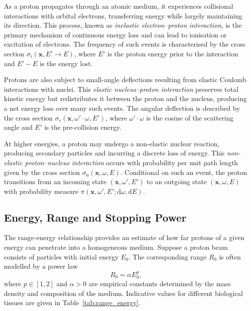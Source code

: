 \documentclass{amsart}
\newcommand{\dd}{{\mathrm d}}
\theoremstyle{plain}
\renewcommand{\vec}[1]{\ensuremath{\boldsymbol{#1}}}
\begin{document}
As a proton propagates through an atomic medium, it experiences
collisional interactions with orbital electrons, transferring energy
while largely maintaining its direction. This process, known as
\emph{inelastic electron--proton interaction}, is the primary
mechanism of continuous energy loss and can lead to ionisation or
excitation of electrons. The frequency of such events is characterised
by the cross section $\sigma_i(\vec{x}, E' \to E)$, where $E'$ is the
proton energy prior to the interaction and $E' - E$ is the energy
lost.

Protons are also subject to small-angle deflections resulting from
elastic Coulomb interactions with nuclei. This \emph{elastic
nucleus--proton interaction} preserves total kinetic energy but
redistributes it between the proton and the nucleus, producing a net
energy loss over many such events. The angular deflection is described
by the cross section $\sigma_e(\vec{x}, \omega' \cdot \omega, E')$,
where $\omega' \cdot \omega$ is the cosine of the scattering angle and
$E'$ is the pre-collision energy.

At higher energies, a proton may undergo a non-elastic nuclear
reaction, producing secondary particles and incurring a discrete loss
of energy. This \emph{non-elastic proton--nucleus interaction} occurs
with probability per unit path length given by the cross section
$\sigma_{\mathrm{n}}(\vec{x}, \omega, E)$. Conditional on such an event, the
proton transitions from an incoming state $(\vec{x}, \omega', E')$ to
an outgoing state $(\vec{x}, \omega, E)$ with probability measure
$\pi(\vec{x}, \omega', E'; \dd\omega, \dd E)$.

\subsection{Energy, Range and Stopping Power}
\label{sec:stopping}

The range-energy relationship provides an estimate of how far protons
of a given energy can penetrate into a homogeneous medium. Suppose a
proton beam consists of particles with initial energy $E_0$. The
corresponding range $R_0$ is often modelled by a power law
\begin{equation}
  R_0 = \alpha E_0^p,
  \label{eq:range_energy}
\end{equation}
where $p \in [1,2]$ and $\alpha > 0$ are empirical constants
determined by the mass density and composition of the
medium. Indicative values for different biological tissues are given
in Table~\ref{tab:range_energy}.
\end{document}
